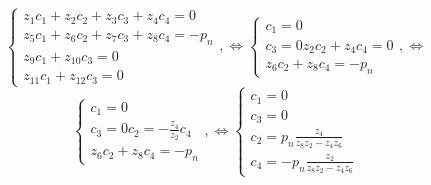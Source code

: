\begin{equation*}
    \begin{cases}
        z_1 c_1 + z_2 c_2 + z_3 c_3 + z_4 c_4 = 0 \\
        z_5 c_1 + z_6 c_2 + z_7 c_3 + z_8 c_4 = -p_n \\
        z_9 c_1 + z_{10} c_3 = 0 \\
        z_{11} c_1 + z_{12} c_3 = 0
    \end{cases}, \Leftrightarrow 
    \begin{cases}
        c_1 = 0 \\
        c_3 = 0
        z_2 c_2 + z_4 c_4 = 0 \\
        z_6 c_2 + z_8 c_4 = -p_n
    \end{cases}, \Leftrightarrow 
\end{equation*}
\begin{equation*}
    \begin{cases}
        c_1 = 0 \\
        c_3 = 0
        c_2 = - \frac{z_4}{z_2} c_4 \\
        z_6 c_2 + z_8 c_4 = -p_n
    \end{cases}, \Leftrightarrow 
    \begin{cases}
        c_1 = 0 \\
        c_3 = 0 \\
        c_2 = p_n \frac{z_4}{z_8 z_2 - z_4 z_6} \\
        c_4 = -p_n \frac{z_2}{z_8 z_2 - z_4 z_6}
    \end{cases}
\end{equation*}